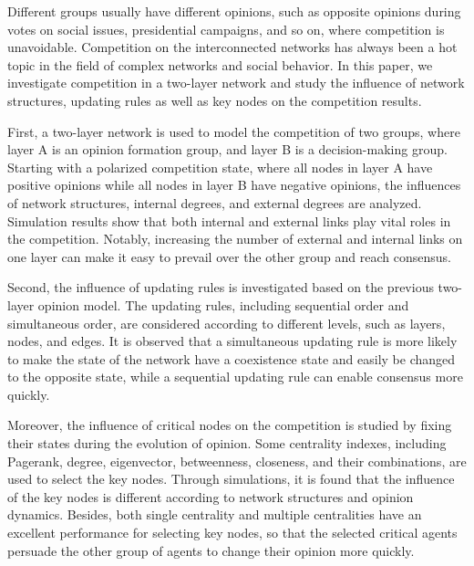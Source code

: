 \begin{englishabstract}
	
Different groups usually have different opinions, such as opposite opinions during votes on social issues, presidential campaigns, and so on, where competition is unavoidable. Competition on the interconnected networks has always been a hot topic in the field of complex networks and social behavior. In this paper, we investigate competition in a two-layer network and study the influence of network structures, updating rules as well as key nodes on the competition results.

First, a two-layer network is used to model the competition of two groups, where layer A is an opinion formation group, and layer B is a decision-making group. Starting with a polarized competition state, where all nodes in layer A have positive opinions while all nodes in layer B have negative opinions, the influences of network structures, internal degrees, and external degrees are analyzed.  Simulation results show that both internal and external links play vital roles in the competition. Notably, increasing the number of external and internal links on one layer can make it easy to prevail over the other group and reach consensus.

Second, the influence of updating rules is investigated based on the previous two-layer opinion model. The updating rules, including sequential order and simultaneous order, are considered according to different levels, such as layers, nodes, and edges. It is observed that a simultaneous updating rule is more likely to make the state of the network have a coexistence state and easily be changed to the opposite state, while a sequential updating rule can enable consensus more quickly.

Moreover, the influence of critical nodes on the competition is studied by fixing their states during the evolution of opinion. Some centrality indexes, including Pagerank, degree, eigenvector, betweenness, closeness, and their combinations, are used to select the key nodes. Through simulations, it is found that the influence of the key nodes is different according to network structures and opinion dynamics. Besides, both single centrality and multiple centralities have an excellent performance for selecting key nodes, so that the selected critical agents persuade the other group of agents to change their opinion more quickly.\\ 

\end{englishabstract}

